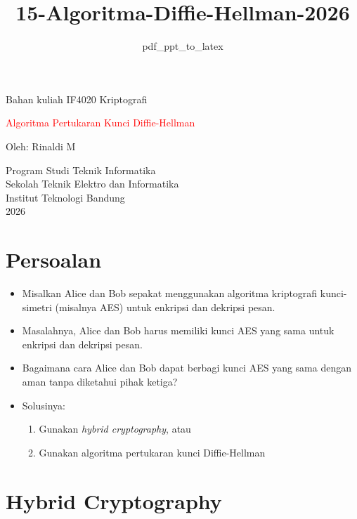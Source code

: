 \documentclass{article}
\title{15-Algoritma-Diffie-Hellman-2026}
\author{pdf\_ppt\_to\_latex}
\date{}
\begin{document}

\begin{center}
Bahan kuliah IF4020 Kriptografi

{\huge \textcolor{red}{Algoritma Pertukaran Kunci Diffie-Hellman}}

\vspace{20mm}

Oleh: Rinaldi M

\vspace{10mm}

Program Studi Teknik Informatika\\
Sekolah Teknik Elektro dan Informatika\\
Institut Teknologi Bandung\\
2026
\end{center}

\newpage


\section*{Persoalan}

\begin{itemize}
    \item Misalkan Alice dan Bob sepakat menggunakan algoritma kriptografi kunci-simetri (misalnya AES) untuk enkripsi dan dekripsi pesan.
    \item Masalahnya, Alice dan Bob harus memiliki kunci AES yang sama untuk enkripsi dan dekripsi pesan.
    \item Bagaimana cara Alice dan Bob dapat berbagi kunci AES yang sama dengan aman tanpa diketahui pihak ketiga?
    \item Solusinya: 
    \begin{enumerate}
        \item Gunakan \textit{hybrid cryptography}, atau
        \item Gunakan algoritma pertukaran kunci Diffie-Hellman
    \end{enumerate}
\end{itemize}

\newpage


\section*{Hybrid Cryptography}
\end{document}
